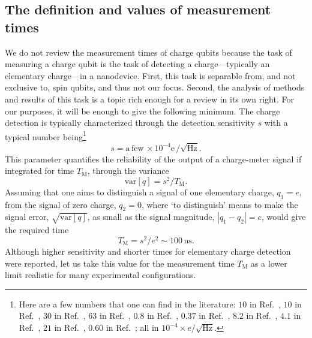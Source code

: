 \documentclass[aps, prx, showpacs, twocolumn, superscriptaddress, notitlepage, longbibliography, floatfix, nofootinbib]{revtex4-2}
\begin{document}
\subsection{The definition and values of measurement times}

We do not review the measurement times of charge qubits because the task of measuring a charge qubit is the task of detecting a charge---typically an elementary charge---in a nanodevice. First, this task is separable from, and not exclusive to, spin qubits, and thus not our focus. Second, the analysis of methods and results of this task is a topic rich enough for a review in its own right. For our purposes, it will be enough to give the following minimum. The charge detection is typically characterized through the detection sensitivity $s$ with a typical number being\footnote
{
Here are a few numbers that one can find in the literature: 
$10$ in Ref.~\cite{reilly_fast_2007},
$10$ in Ref.~\cite{wang_graphene_2010},
$30$ in Ref.~\cite{fringes_charge_2011}, 
$63$ in Ref.~\cite{colless_dispersive_2013},
$0.8$ in Ref.~\cite{stehlik_fast_2015},
$0.37$ in Ref.~\cite{gonzalez-zalba_probing_2015},
$8.2$ in Ref.~\cite{zajac_scalable_2016},
$4.1$ in Ref.~\cite{zheng_rapid_2019},
$21$ in Ref.~\cite{chanrion_charge_2020},
$0.60$ in Ref.~\cite{schupp_sensitive_2020};
all in $10^{-4} \times e/\surd{\mathrm{Hz}}$.
} 
\begin{equation}
s = \mathrm{a\,few}\, \times 10^{-4}\mathrm{e}\, / \sqrt{\mathrm{Hz}}.  
\label{eq:chargeSensitivity}
\end{equation}
This parameter quantifies the reliability of the output of a charge-meter signal if integrated for time $T_\mathrm{M}$, through the variance
\begin{equation}
\textrm{var}[q] = s^2 / T_\mathrm{M}.
\end{equation}
Assuming that one aims to distinguish a signal of one elementary charge, $q_1=e$, from the signal of zero charge, $q_2=0$, where `to distinguish' means to make the signal error, $\sqrt{\textrm{var}[q]}$, as small as the signal magnitude, $|q_1-q_2|=e$, would give the required time
\begin{equation}
T_\mathrm{M} = s^2 / e^2 \sim 100\, \mathrm{ns}.
\label{eq:detectionLimit}
\end{equation}
Although higher sensitivity\cite{schaal_fast_2020} and shorter times\cite{keith_single-shot_2019} for elementary charge detection were reported, let us take this value for the measurement time $T_\mathrm{M}$ as a lower limit 
realistic  for many experimental configurations. 
\end{document}
